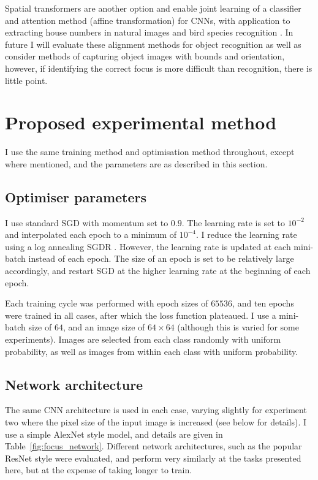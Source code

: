Spatial transformers \cite{Jaderberg2015} are another option and enable joint learning of a classifier and attention method (affine transformation) for \gls{CNN}s, with application to extracting house numbers in natural images \cite{Netzer2011} and bird species recognition \cite{Wah2011}. In future I will evaluate these alignment methods for object recognition as well as consider methods of capturing object images with bounds and orientation, however, if identifying the correct focus is more difficult than recognition, there is little point.


\section{Proposed experimental method}

I use the same training method and optimisation method throughout, except where mentioned, and the parameters are as described in this section. 

\subsection {Optimiser parameters}

I use standard \gls{SGD} with momentum set to $ 0.9 $. The learning rate is set to $ 10^{-2} $ and interpolated each epoch to a minimum of $ 10^{-4} $. I reduce the learning rate using a log annealing \gls{SGDR}  \cite{Loshchilov2016}. However, the learning rate is updated at each mini-batch instead of each epoch. The size of an epoch is set to be relatively large accordingly, and restart SGD at the higher learning rate at the beginning of each epoch. 

Each training cycle was performed with epoch sizes of $65536$, and ten epochs were trained in all cases, after which the loss function plateaued. I use a mini-batch size of $64$, and an image size of $64\times64$ (although this is varied for some experiments). Images are selected from each class randomly with uniform probability, as well as images from within each class with uniform probability.

\subsection {Network architecture}

The same \gls{CNN} architecture is used in each case, varying slightly for experiment two where the pixel size of the input image is increased (see below for details). I use a simple AlexNet \cite {Krizhevsky2012} style model, and details are given in Table~\ref{fig:focus_network}. Different network architectures, such as the popular ResNet \cite{He2015} style were evaluated, and perform very similarly at the tasks presented here, but at the expense of taking longer to train.

